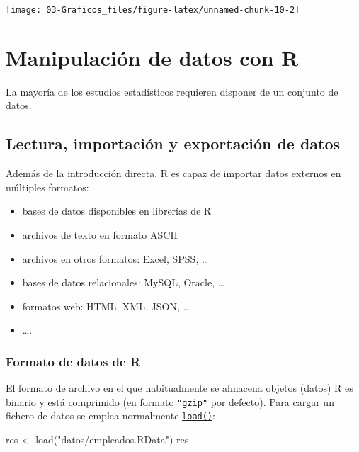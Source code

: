 \documentclass[
]{book}
\newenvironment{Shaded}{\begin{snugshade}}{\end{snugshade}}
\newcommand{\FunctionTok}[1]{\textcolor[rgb]{0.00,0.00,0.00}{#1}}
\newcommand{\NormalTok}[1]{#1}
\newcommand{\OtherTok}[1]{\textcolor[rgb]{0.56,0.35,0.01}{#1}}
\newcommand{\StringTok}[1]{\textcolor[rgb]{0.31,0.60,0.02}{#1}}
\theoremstyle{break}
\theoremstyle{nonumberplain}
\begin{document}
\begin{center}\texttt{[image: 03-Graficos\_files/figure-latex/unnamed-chunk-10-2]} \end{center}

\hypertarget{manipulaciuxf3n-de-datos-con-r}{%
\chapter{Manipulación de datos con R}\label{manipulaciuxf3n-de-datos-con-r}}

La mayoría de los estudios estadísticos
requieren disponer de un conjunto de datos.

\hypertarget{lectura-importaciuxf3n-y-exportaciuxf3n-de-datos}{%
\section{Lectura, importación y exportación de datos}\label{lectura-importaciuxf3n-y-exportaciuxf3n-de-datos}}

Además de la introducción directa, R es capaz de
importar datos externos en múltiples formatos:

\begin{itemize}
\item
  bases de datos disponibles en librerías de R
\item
  archivos de texto en formato ASCII
\item
  archivos en otros formatos: Excel, SPSS, \ldots{}
\item
  bases de datos relacionales: MySQL, Oracle, \ldots{}
\item
  formatos web: HTML, XML, JSON, \ldots{}
\item
  \ldots.
\end{itemize}

\hypertarget{formato-de-datos-de-r}{%
\subsection{Formato de datos de R}\label{formato-de-datos-de-r}}

El formato de archivo en el que habitualmente se almacena objetos (datos)
R es binario y está comprimido (en formato \texttt{"gzip"} por defecto).
Para cargar un fichero de datos se emplea normalmente \href{https://www.rdocumentation.org/packages/base/versions/3.6.1/topics/load}{\texttt{load()}}:

\begin{Shaded}
\begin{Highlighting}[]
\NormalTok{res }\OtherTok{\textless{}{-}} \FunctionTok{load}\NormalTok{(}\StringTok{"datos/empleados.RData"}\NormalTok{)}
\NormalTok{res}
\end{Highlighting}
\end{Shaded}
\end{document}
